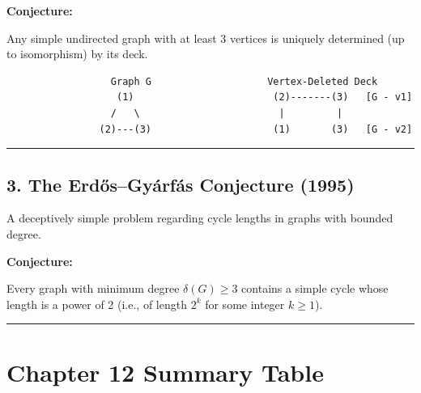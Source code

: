 \documentclass[
]{book}
\theoremstyle{definition}
\theoremstyle{definition}
\theoremstyle{definition}
\theoremstyle{definition}
\theoremstyle{remark}
\begin{document}
\textbf{Conjecture:}

Any simple undirected graph with at least 3 vertices is uniquely determined (up to isomorphism) by its deck.

\begin{verbatim}
                  Graph G                    Vertex-Deleted Deck
                   (1)                        (2)-------(3)   [G - v1]
                  /   \                        |         |
                (2)---(3)                     (1)       (3)   [G - v2]
\end{verbatim}

\begin{center}\rule{0.5\linewidth}{0.5pt}\end{center}

\subsection{3. The Erdős--Gyárfás Conjecture (1995)}\label{the-erdux151sgyuxe1rfuxe1s-conjecture-1995}

A deceptively simple problem regarding cycle lengths in graphs with bounded degree.

\textbf{Conjecture:}

Every graph with minimum degree \(\delta(G) \ge 3\) contains a simple cycle whose length is a power of 2 (i.e., of length \(2^k\) for some integer \(k \ge 1\)).

\begin{center}\rule{0.5\linewidth}{0.5pt}\end{center}

\section{Chapter 12 Summary Table}\label{chapter-12-summary-table}
\end{document}
